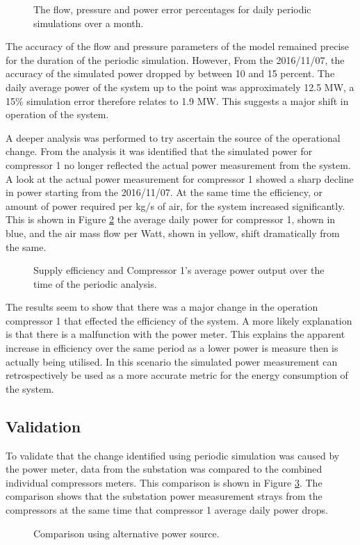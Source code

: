 	\begin{figure}[h]
		\centering
		\fbox{}
		\caption{The flow, pressure and power error percentages for daily periodic simulations over a month.}
		\label{fig: Periodic simulation}
	\end{figure}   
The accuracy of the flow and pressure parameters of the model remained precise for the duration of the periodic simulation. However, From the 2016/11/07, the accuracy of the simulated power dropped by between 10 and 15 percent. The daily average power of the system up to the point was approximately 12.5 MW, a 15\% simulation error therefore relates to 1.9 MW. This suggests a major shift in operation of the system.
\par 
A deeper analysis was performed to try ascertain the source of the operational change. From the analysis it was identified that the simulated power for compressor 1 no longer reflected the actual power measurement from the system. A look at the actual power measurement for compressor 1 showed a sharp decline in power starting from the 2016/11/07. At the same time the efficiency, or amount of power required per kg/s of air, for the system increased significantly. This is shown in Figure \ref{fig: MeasurementAccuracy.} the average daily power for compressor 1, shown in blue, and the air mass flow per Watt, shown in yellow, shift dramatically from the same. 
	\begin{figure}[h]
		\centering
		\fbox{}
		\caption{Supply efficiency and Compressor 1's average power output over the time of the periodic analysis.}
		\label{fig: MeasurementAccuracy.}
	\end{figure} 
   The results seem to show that there was a major change in the operation compressor 1 that effected the efficiency of the system. A more likely explanation is that there is a malfunction with the power meter. This explains the apparent increase in efficiency over the same period as a lower power is measure then is actually being utilised. In this scenario the simulated power measurement can retrospectively be used as a more accurate metric for the energy consumption of the system.  
   \subsection{Validation}
   To validate that the change identified using periodic simulation was caused by the power meter, data from the substation was compared to the combined individual compressors meters. This comparison is shown in Figure \ref{fig: Corrected Periodic simulation}. The comparison shows that the substation power measurement strays from the compressors at the same time that compressor 1 average daily power drops.
	\begin{figure}[h]
		\centering
		\fbox{}
		\caption{Comparison using alternative power source.}
		\label{fig: Corrected Periodic simulation}
	\end{figure}    
	
